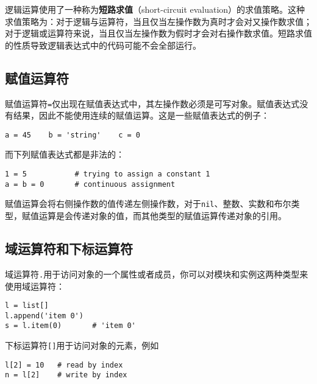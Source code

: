 逻辑运算使用了一种称为\textbf{短路求值}（short-circuit evaluation）的求值策略。这种求值策略为：对于逻辑与运算符，当且仅当左操作数为真时才会对又操作数求值；对于逻辑或运算符来说，当且仅当左操作数为假时才会对右操作数求值。短路求值的性质导致逻辑表达式中的代码可能不会全部运行。

\subsection{赋值运算符} \label{section::assign_operator}

赋值运算符\texttt{=}仅出现在赋值表达式中，其左操作数必须是可写对象。赋值表达式没有结果，因此不能使用连续的赋值运算。这是一些赋值表达式的例子：
\begin{lstlisting}[language=berry, numbers=none]
a = 45    b = 'string'    c = 0
\end{lstlisting}
而下列赋值表达式都是非法的：
\begin{lstlisting}[language=berry, numbers=none]
1 = 5           # trying to assign a constant 1
a = b = 0       # continuous assignment
\end{lstlisting}

赋值运算会将右侧操作数的值传递左侧操作数，对于\texttt{nil}、整数、实数和布尔类型，赋值运算是会传递对象的值，而其他类型的赋值运算传递对象的引用。

\subsection{域运算符和下标运算符}

域运算符\texttt{.}用于访问对象的一个属性或者成员，你可以对模块和实例这两种类型来使用域运算符：
\begin{lstlisting}[language=berry, numbers=none]
l = list[]
l.append('item 0')
s = l.item(0)       # 'item 0'
\end{lstlisting}

下标运算符\texttt{[]}用于访问对象的元素，例如
\begin{lstlisting}[language=berry, numbers=none]
l[2] = 10   # read by index
n = l[2]    # write by index
\end{lstlisting}
